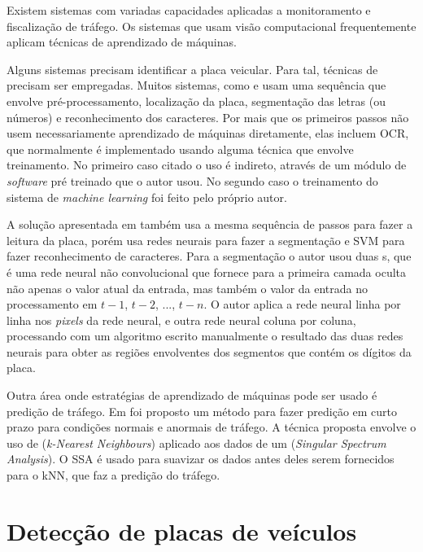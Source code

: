 Existem sistemas com variadas capacidades aplicadas a monitoramento e
fiscalização de tráfego. Os sistemas que usam visão computacional
frequentemente aplicam técnicas de aprendizado de máquinas.

Alguns sistemas precisam identificar a placa veicular. Para tal, técnicas de
 precisam ser empregadas. Muitos sistemas, como
 e  usam uma
sequência que
envolve pré-processamento, localização da placa, segmentação das letras (ou
números) e reconhecimento dos caracteres. Por mais que os primeiros passos não
usem necessariamente aprendizado de máquinas diretamente, elas incluem OCR,
que normalmente é implementado usando alguma técnica que envolve treinamento.
No primeiro caso citado o uso é indireto, através de um módulo de
\emph{software}
pré treinado que o autor usou. No segundo caso o treinamento do sistema de
\emph{machine learning} foi feito pelo próprio autor.

A solução apresentada em
 também usa a mesma sequência de
passos para fazer a leitura da placa, porém usa redes neurais para 
fazer a segmentação e SVM para fazer reconhecimento de caracteres. Para a
segmentação o autor usou duas
s, que é uma rede neural não convolucional que
fornece para a primeira camada oculta não apenas o valor atual da entrada, mas
também o valor da entrada no processamento em $t-1$, $t-2$, ..., $t-n$. O autor
aplica a rede neural linha por linha nos \emph{pixels} da rede neural, e outra
rede neural coluna por coluna, processando com um algoritmo escrito manualmente
o resultado das duas redes neurais para obter as regiões envolventes dos
segmentos que contém os dígitos da placa.

Outra área onde estratégias de aprendizado de máquinas pode ser usado é
predição de tráfego. Em  foi proposto um método para
fazer
predição em curto prazo para condições normais e anormais de tráfego. A técnica
proposta envolve o uso de  (\emph{k-Nearest Neighbours}) aplicado aos dados de um
(\emph{Singular Spectrum Analysis}). O SSA é usado para suavizar os dados antes
deles serem fornecidos para o kNN, que faz a predição do tráfego.

\section{Detecção de placas de veículos} \label{sec:cap3_detec_placas}

